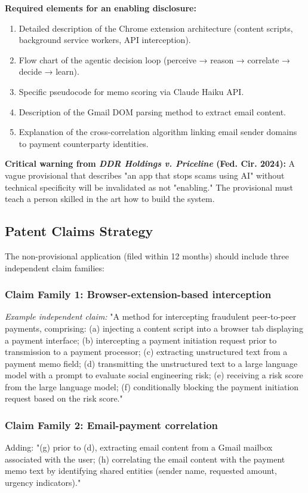 \documentclass[12pt]{article}
\begin{document}
\textbf{Required elements for an enabling disclosure:}
\begin{enumerate}
    \item Detailed description of the Chrome extension architecture (content scripts, background service workers, API interception).
    \item Flow chart of the agentic decision loop (perceive → reason → correlate → decide → learn).
    \item Specific pseudocode for memo scoring via Claude Haiku API.
    \item Description of the Gmail DOM parsing method to extract email content.
    \item Explanation of the cross-correlation algorithm linking email sender domains to payment counterparty identities.
\end{enumerate}

\textbf{Critical warning from \textit{DDR Holdings v. Priceline} (Fed. Cir. 2024):} A vague provisional that describes "an app that stops scams using AI" without technical specificity will be invalidated as not "enabling." The provisional must teach a person skilled in the art how to build the system.

\subsection{Patent Claims Strategy}

The non-provisional application (filed within 12 months) should include three independent claim families:

\subsubsection{Claim Family 1: Browser-extension-based interception}
\textit{Example independent claim:}
"A method for intercepting fraudulent peer-to-peer payments, comprising:
(a) injecting a content script into a browser tab displaying a payment interface;
(b) intercepting a payment initiation request prior to transmission to a payment processor;
(c) extracting unstructured text from a payment memo field;
(d) transmitting the unstructured text to a large language model with a prompt to evaluate social engineering risk;
(e) receiving a risk score from the large language model;
(f) conditionally blocking the payment initiation request based on the risk score."

\subsubsection{Claim Family 2: Email-payment correlation}
Adding: "(g) prior to (d), extracting email content from a Gmail mailbox associated with the user; (h) correlating the email content with the payment memo text by identifying shared entities (sender name, requested amount, urgency indicators)."
\end{document}
